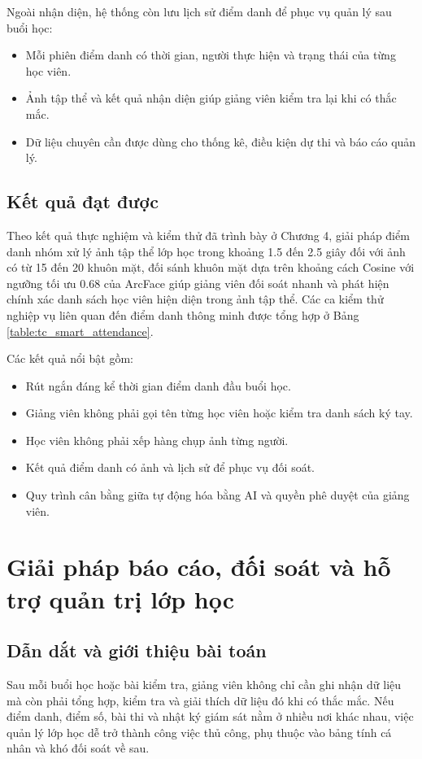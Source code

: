 \documentclass[../DoAn.tex]{subfiles}
\begin{document}
Ngoài nhận diện, hệ thống còn lưu lịch sử điểm danh để phục vụ quản lý sau buổi học:
\begin{itemize}
    \item Mỗi phiên điểm danh có thời gian, người thực hiện và trạng thái của từng học viên.
    \item Ảnh tập thể và kết quả nhận diện giúp giảng viên kiểm tra lại khi có thắc mắc.
    \item Dữ liệu chuyên cần được dùng cho thống kê, điều kiện dự thi và báo cáo quản lý.
\end{itemize}

\subsection{Kết quả đạt được}
Theo kết quả thực nghiệm và kiểm thử đã trình bày ở Chương 4, giải pháp điểm danh nhóm xử lý ảnh tập thể lớp học trong khoảng 1.5 đến 2.5 giây đối với ảnh có từ 15 đến 20 khuôn mặt, đối sánh khuôn mặt dựa trên khoảng cách Cosine với ngưỡng tối ưu 0.68 của ArcFace \cite{Deng_2019_CVPR} giúp giảng viên đối soát nhanh và phát hiện chính xác danh sách học viên hiện diện trong ảnh tập thể. Các ca kiểm thử nghiệp vụ liên quan đến điểm danh thông minh được tổng hợp ở Bảng \ref{table:tc_smart_attendance}.

Các kết quả nổi bật gồm:
\begin{itemize}
    \item Rút ngắn đáng kể thời gian điểm danh đầu buổi học.
    \item Giảng viên không phải gọi tên từng học viên hoặc kiểm tra danh sách ký tay.
    \item Học viên không phải xếp hàng chụp ảnh từng người.
    \item Kết quả điểm danh có ảnh và lịch sử để phục vụ đối soát.
    \item Quy trình cân bằng giữa tự động hóa bằng AI và quyền phê duyệt của giảng viên.
\end{itemize}

\section{Giải pháp báo cáo, đối soát và hỗ trợ quản trị lớp học}
\label{section:5.3}

\subsection{Dẫn dắt và giới thiệu bài toán}
Sau mỗi buổi học hoặc bài kiểm tra, giảng viên không chỉ cần ghi nhận dữ liệu mà còn phải tổng hợp, kiểm tra và giải thích dữ liệu đó khi có thắc mắc. Nếu điểm danh, điểm số, bài thi và nhật ký giám sát nằm ở nhiều nơi khác nhau, việc quản lý lớp học dễ trở thành công việc thủ công, phụ thuộc vào bảng tính cá nhân và khó đối soát về sau.
\end{document}
